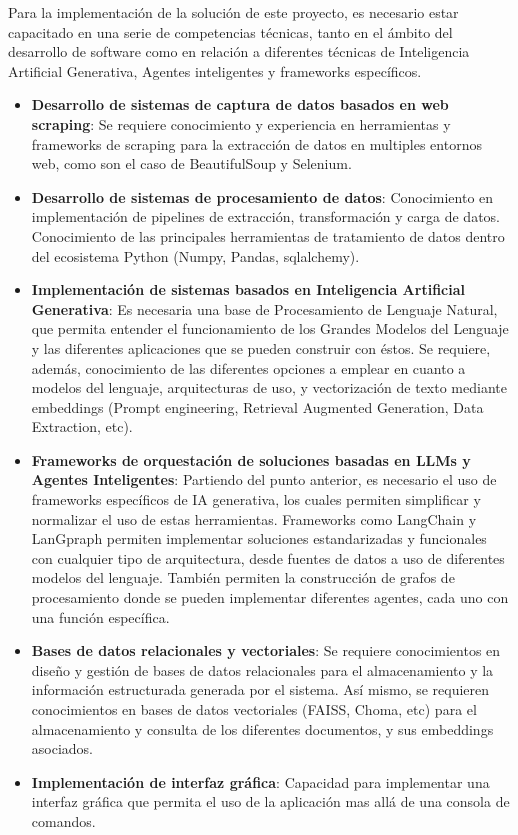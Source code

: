 Para la implementación de la solución de este proyecto, es necesario estar capacitado en una serie de competencias técnicas, tanto en el ámbito del desarrollo de software como en relación a diferentes técnicas de Inteligencia Artificial Generativa, Agentes inteligentes y frameworks específicos.

\begin{itemize}
    \item \textbf{Desarrollo de sistemas de captura de datos basados en web scraping}:
    Se requiere conocimiento y experiencia en herramientas y frameworks de scraping para la extracción de datos en multiples entornos web, como son el caso de BeautifulSoup y Selenium.

    \item \textbf{Desarrollo de sistemas de procesamiento de datos}:
    Conocimiento en implementación de pipelines de extracción, transformación y carga de datos. 
    Conocimiento de las principales herramientas de tratamiento de datos dentro del ecosistema Python (Numpy, Pandas, sqlalchemy).
    
    \item \textbf{Implementación de sistemas basados en Inteligencia Artificial Generativa}:
    Es necesaria una base de Procesamiento de Lenguaje Natural, que permita entender el funcionamiento de los Grandes Modelos del Lenguaje y las diferentes aplicaciones que se pueden construir con éstos.
    Se requiere, además, conocimiento de las diferentes opciones a emplear en cuanto a modelos del lenguaje, arquitecturas de uso, y vectorización de texto mediante embeddings (Prompt engineering, Retrieval Augmented Generation, Data Extraction, etc).
    
    \item \textbf{Frameworks de orquestación de soluciones basadas en LLMs y Agentes Inteligentes}: 
    Partiendo del punto anterior, es necesario el uso de frameworks específicos de IA generativa, los cuales permiten simplificar y normalizar el uso de estas herramientas. 
    Frameworks como LangChain y LanGpraph permiten implementar soluciones estandarizadas y funcionales con cualquier tipo de arquitectura, desde fuentes de datos a uso de diferentes modelos del lenguaje.
    También permiten la construcción de grafos de procesamiento donde se pueden implementar diferentes agentes, cada uno con una función específica. 
    
    \item \textbf{Bases de datos relacionales y vectoriales}: 
    Se requiere conocimientos en diseño y gestión de bases de datos relacionales para el almacenamiento y la información estructurada generada por el sistema.
    Así mismo, se requieren conocimientos en bases de datos vectoriales (FAISS, Choma, etc) para el almacenamiento y consulta de los diferentes documentos, y sus embeddings asociados.

    \item \textbf{Implementación de interfaz gráfica}: 
    Capacidad para implementar una interfaz gráfica que permita el uso de la aplicación mas allá de una consola de comandos.   
\end{itemize}

